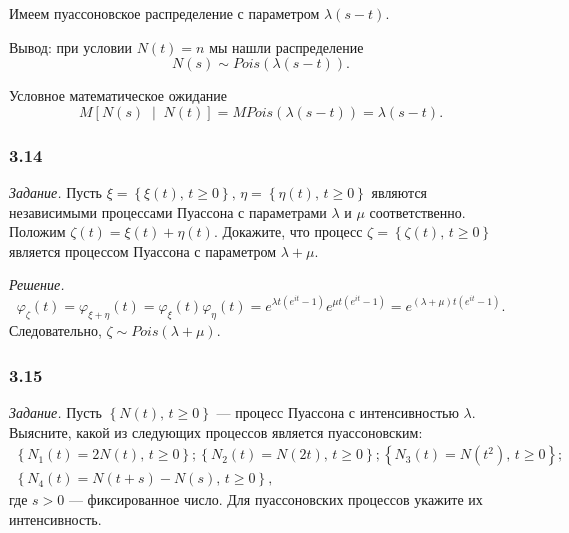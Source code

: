 Имеем пуассоновское распределение с параметром $ \lambda \left( s - t \right) $.

Вывод: при условии $N \left( t \right) = n$ мы нашли распределение
$$N \left( s \right) \sim Pois \left( \lambda \left( s - t \right) \right).$$

Условное математическое ожидание
$$M \left[ N \left( s \right) \; \middle| \; N \left( t \right) \right] =
  MPois \left( \lambda \left( s - t \right) \right) =
  \lambda \left( s - t \right).$$

\subsubsection*{3.14}
\textit{Задание.}
Пусть
$ \xi = \left\{ \xi \left( t \right), \, t \geq 0 \right\}, \,
  \eta = \left\{ \eta \left( t \right), \, t \geq 0 \right\} $
являются независимыми процессами Пуассона с параметрами $ \lambda $ и $ \mu $ соответственно.
Положим $ \zeta \left( t \right) = \xi \left( t \right) + \eta \left( t \right) $.
Докажите, что процесс $ \zeta = \left\{ \zeta \left( t \right), \, t \geq 0 \right\} $
является процессом Пуассона с параметром $ \lambda + \mu $.

\textit{Решение.}
$$ \varphi_{ \zeta } \left( t \right) =
  \varphi_{ \xi + \eta } \left( t \right) =
  \varphi_{ \xi } \left( t \right) \varphi_{ \eta } \left( t \right) =
  e^{ \lambda t \left( e^{it} - 1 \right) } e^{ \mu t \left( e^{it} - 1 \right) } =
  e^{ \left( \lambda + \mu \right) t \left( e^{it} - 1 \right) }.$$
Следовательно, $ \zeta \sim Pois \left( \lambda + \mu \right) $.

\subsubsection*{3.15}

\textit{Задание.}
Пусть $ \left\{ N \left( t \right), \, t \geq 0 \right\} $ ---
процесс Пуассона с интенсивностью $ \lambda $.
Выясните, какой из следующих процессов является пуассоновским:
\begin{gather*}
  \left\{ N_1 \left( t \right) = 2N \left( t \right), \, t \geq 0 \right\};
  \left\{ N_2 \left( t \right) = N \left( 2t \right), \, t \geq 0 \right\};
  \left\{ N_3 \left( t \right) = N \left( t^2 \right), \, t \geq 0 \right\}; \\
  \left\{ N_4 \left( t \right) = N \left( t + s \right) - N \left( s \right), \, t \geq 0 \right\},
\end{gather*}
где $s > 0$ --- фиксированное число.
Для пуассоновских процессов укажите их интенсивность.

